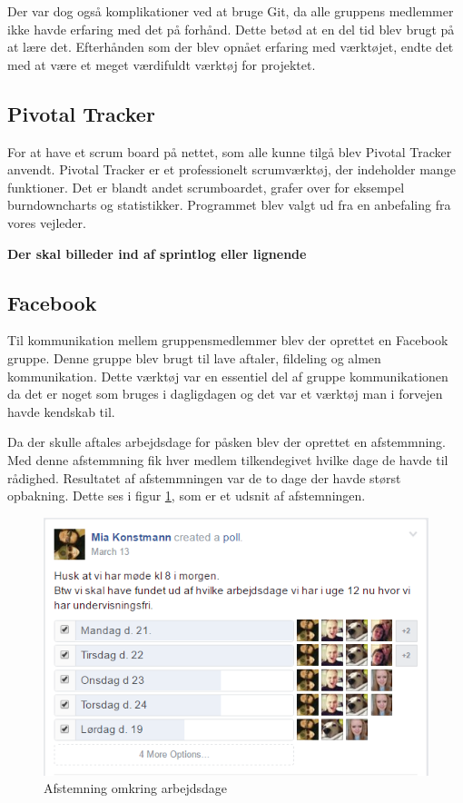 \noindent Der var dog også komplikationer ved at bruge Git, da alle gruppens medlemmer ikke havde erfaring med det på forhånd. Dette betød at en del tid blev brugt på at lære det. Efterhånden som der blev opnået erfaring med værktøjet, endte det med at være et meget værdifuldt værktøj for projektet.  

\subsection{Pivotal Tracker}
For at have et scrum board på nettet, som alle kunne tilgå blev Pivotal Tracker anvendt. Pivotal Tracker er et professionelt scrumværktøj, der indeholder mange funktioner. Det er blandt andet scrumboardet, grafer over for eksempel burndowncharts og statistikker. Programmet blev valgt ud fra en anbefaling fra vores vejleder.

\textbf{Der skal billeder ind af sprintlog eller lignende} 

\subsection{Facebook}
Til kommunikation mellem gruppensmedlemmer blev der oprettet en Facebook gruppe. Denne gruppe blev brugt til lave aftaler, fildeling og almen kommunikation. Dette værktøj var en essentiel del af gruppe kommunikationen da det er noget som bruges i dagligdagen og det var et værktøj man i forvejen havde kendskab til. \newline

Da der skulle aftales arbejdsdage for påsken blev der oprettet en afstemmning. Med denne afstemmning fik hver medlem tilkendegivet hvilke dage de havde til rådighed. Resultatet af afstemmningen var de to dage der havde størst opbakning. Dette ses i figur \ref{ref:fbpoll}, som er et udsnit af afstemningen.
\begin{figure}[H]
	\centering
	\includegraphics[scale=0.6]{Projektgennemfoerelse/images/fbpoll}
	\caption{Afstemning omkring arbejdsdage}
	\label{ref:fbpoll}
\end{figure}

